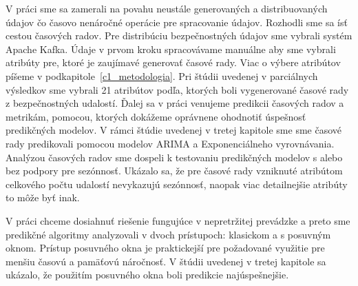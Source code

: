 \documentclass[thesismargins, thesislinespacing, openright, upjsfrontpage, combineabstracts]{rnthesis}
\begin{document}
V práci sme sa zamerali na povahu neustále generovaných a distribuovaných údajov čo časovo nenáročné operácie pre spracovanie údajov. Rozhodli sme sa ísť cestou časových radov. Pre distribúciu bezpečnostných údajov sme vybrali systém Apache Kafka. Údaje v prvom kroku spracovávame manuálne aby sme vybrali atribúty pre, ktoré je zaujímavé generovať časové rady. Viac o výbere atribútov píšeme v podkapitole~\ref{c1_metodologia}. Pri štúdii uvedenej v parciálnych výsledkov sme vybrali 21 atribútov podľa, ktorých boli vygenerované časové rady z bezpečnostných udalostí. Ďalej sa v práci venujeme predikcii časových radov a metrikám, pomocou, ktorých dokážeme oprávnene ohodnotiť úspešnosť predikčných modelov. V rámci štúdie uvedenej v tretej kapitole sme sme časové rady predikovali pomocou modelov ARIMA a Exponenciálneho vyrovnávania. Analýzou časových radov sme dospeli k testovaniu predikčných modelov s alebo bez podpory pre sezónnosť. Ukázalo sa, že pre časové rady vzniknuté atribútom celkového počtu udalostí nevykazujú sezónnosť, naopak viac detailnejšie atribúty to môže byť inak.

V práci chceme dosiahnuť riešenie fungujúce v nepretržitej prevádzke a preto sme predikčné algoritmy analyzovali v dvoch prístupoch: klasickom a s posuvným oknom. Prístup posuvného okna je praktickejší pre požadované využitie pre menšiu časovú a pamäťovú náročnosť. V štúdii uvedenej v tretej kapitole sa ukázalo, že použitím posuvného okna boli predikcie najúspešnejšie.


%
%
\prilohy
{}
\end{document}
